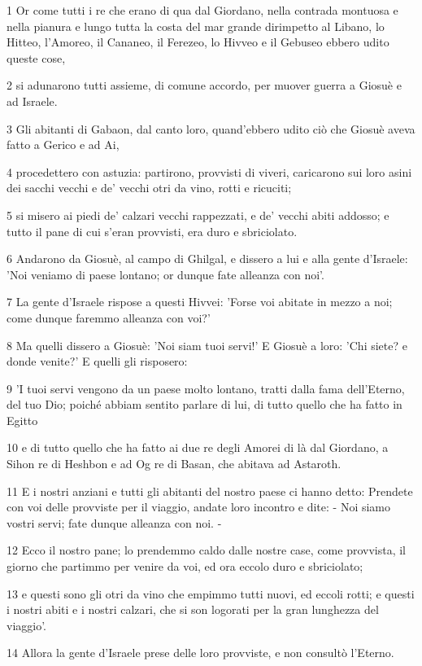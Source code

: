 \par 1 Or come tutti i re che erano di qua dal Giordano, nella contrada montuosa e nella pianura e lungo tutta la costa del mar grande dirimpetto al Libano, lo Hitteo, l'Amoreo, il Cananeo, il Ferezeo, lo Hivveo e il Gebuseo ebbero udito queste cose,
\par 2 si adunarono tutti assieme, di comune accordo, per muover guerra a Giosuè e ad Israele.
\par 3 Gli abitanti di Gabaon, dal canto loro, quand'ebbero udito ciò che Giosuè aveva fatto a Gerico e ad Ai,
\par 4 procedettero con astuzia: partirono, provvisti di viveri, caricarono sui loro asini dei sacchi vecchi e de' vecchi otri da vino, rotti e ricuciti;
\par 5 si misero ai piedi de' calzari vecchi rappezzati, e de' vecchi abiti addosso; e tutto il pane di cui s'eran provvisti, era duro e sbriciolato.
\par 6 Andarono da Giosuè, al campo di Ghilgal, e dissero a lui e alla gente d'Israele: 'Noi veniamo di paese lontano; or dunque fate alleanza con noi'.
\par 7 La gente d'Israele rispose a questi Hivvei: 'Forse voi abitate in mezzo a noi; come dunque faremmo alleanza con voi?'
\par 8 Ma quelli dissero a Giosuè: 'Noi siam tuoi servi!' E Giosuè a loro: 'Chi siete? e donde venite?' E quelli gli risposero:
\par 9 'I tuoi servi vengono da un paese molto lontano, tratti dalla fama dell'Eterno, del tuo Dio; poiché abbiam sentito parlare di lui, di tutto quello che ha fatto in Egitto
\par 10 e di tutto quello che ha fatto ai due re degli Amorei di là dal Giordano, a Sihon re di Heshbon e ad Og re di Basan, che abitava ad Astaroth.
\par 11 E i nostri anziani e tutti gli abitanti del nostro paese ci hanno detto: Prendete con voi delle provviste per il viaggio, andate loro incontro e dite: - Noi siamo vostri servi; fate dunque alleanza con noi. -
\par 12 Ecco il nostro pane; lo prendemmo caldo dalle nostre case, come provvista, il giorno che partimmo per venire da voi, ed ora eccolo duro e sbriciolato;
\par 13 e questi sono gli otri da vino che empimmo tutti nuovi, ed eccoli rotti; e questi i nostri abiti e i nostri calzari, che si son logorati per la gran lunghezza del viaggio'.
\par 14 Allora la gente d'Israele prese delle loro provviste, e non consultò l'Eterno.
